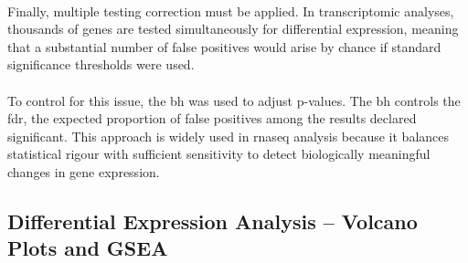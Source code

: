 \\
\linebreak
\noindent
Finally, multiple testing correction must be applied. In transcriptomic analyses, thousands of genes are tested simultaneously for differential expression, meaning that a substantial number of false positives would arise by chance if standard significance thresholds were used.
\\
\\
To control for this issue, the \gls{bh} was used to adjust p-values\cite{benjamini_controlling_1995}. The \gls{bh} controls the \gls{fdr}, the expected proportion of false positives among the results declared significant\cite{benjamini_controlling_1995}. This approach is widely used in \gls{rnaseq} analysis because it balances statistical rigour with sufficient sensitivity to detect biologically meaningful changes in gene expression. 

\subsection{Differential Expression Analysis – Volcano Plots and GSEA}

